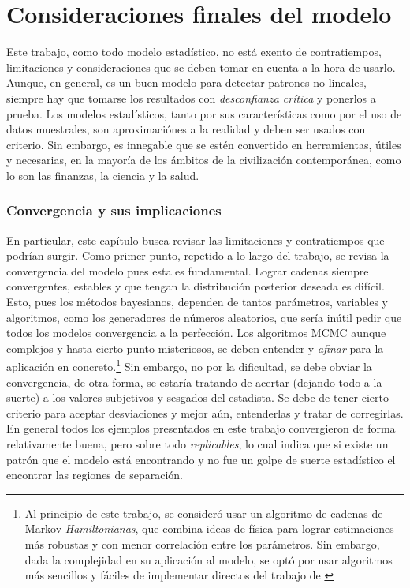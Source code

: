 \documentclass[../Main/Main.tex]{subfiles}
\begin{document}
\section{Consideraciones finales del modelo}

Este trabajo, como todo modelo estadístico, no está exento de contratiempos, limitaciones y consideraciones que se deben tomar en cuenta a la hora de usarlo. Aunque, en general, es un buen modelo para detectar patrones no lineales, siempre hay que tomarse los resultados con \textit{desconfianza crítica} y ponerlos a prueba. Los modelos estadísticos, tanto por sus características como por el uso de datos muestrales, son aproximaciónes a la realidad y deben ser usados con criterio. Sin embargo, es innegable que se estén convertido en herramientas, útiles y necesarias, en la mayoría de los ámbitos de la civilización contemporánea, como lo son las finanzas, la ciencia y la salud.

\subsubsection*{Convergencia y sus implicaciones}
En particular, este capítulo busca revisar las limitaciones y contratiempos que podrían surgir. Como primer punto, repetido a lo largo del trabajo, se revisa la convergencia del modelo pues esta es fundamental. Lograr cadenas siempre convergentes, estables y que tengan la distribución posterior deseada es  difícil. Esto, pues los métodos bayesianos, dependen de tantos  parámetros, variables y algoritmos, como los generadores de números aleatorios, que sería inútil pedir que todos los modelos convergencia a la perfección. Los algoritmos MCMC aunque complejos y hasta cierto punto misteriosos, se deben entender y \textit{afinar} para la aplicación en concreto.\footnote{Al principio de este trabajo, se consideró usar un algoritmo de cadenas de Markov \textit{Hamiltonianas}, que combina ideas de física para lograr estimaciones más robustas y con menor correlación entre los parámetros. Sin embargo, dada la complejidad en su aplicación al modelo, se optó por usar algoritmos más sencillos y fáciles de implementar directos del trabajo de \autocite{albert1993bayesian}} Sin embargo, no por la dificultad, se debe obviar la convergencia, de otra forma, se estaría tratando de acertar (dejando todo a la suerte) a los valores subjetivos y sesgados del estadista. Se debe de tener cierto criterio para aceptar desviaciones y mejor aún, entenderlas y tratar de corregirlas. En general todos los ejemplos presentados en este trabajo convergieron de forma relativamente buena, pero sobre todo \textit{replicables}, lo cual indica que si existe un patrón que el modelo está encontrando y no fue un golpe de suerte estadístico el encontrar las regiones de separación. %
\end{document}
